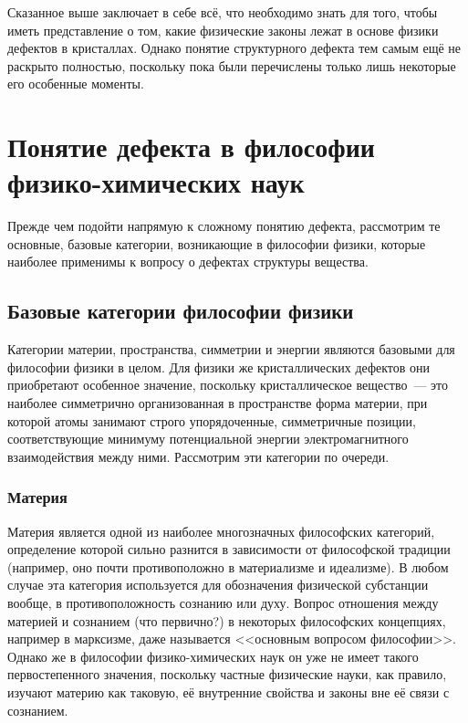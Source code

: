 \documentclass[a4paper, 14pt, titlepage]{extarticle}
\begin{document}

  Сказанное выше заключает в себе всё, что необходимо знать для того, чтобы иметь представление о
  том, какие физические законы лежат в основе физики дефектов в кристаллах. Однако понятие
  структурного дефекта тем самым ещё не раскрыто полностью, поскольку пока были перечислены только
  лишь некоторые его особенные моменты.

  \section{Понятие дефекта в философии физико-химических наук}

  Прежде чем подойти напрямую к сложному понятию дефекта, рассмотрим те основные, базовые категории,
  возникающие в философии физики, которые наиболее применимы к вопросу о дефектах структуры вещества.

  \subsection{Базовые категории философии физики}

  Категории материи, пространства, симметрии и энергии являются базовыми для философии физики в
  целом. Для физики же кристаллических дефектов они приобретают особенное значение, поскольку
  кристаллическое вещество~--- это наиболее симметрично организованная в пространстве форма материи,
  при которой атомы занимают строго упорядоченные, симметричные позиции, соответствующие минимуму потенциальной
  энергии электромагнитного взаимодействия между ними. Рассмотрим эти категории по очереди.

  \subsubsection{Материя}

  Материя является одной из наиболее многозначных философских категорий, определение которой сильно
  разнится в зависимости от философской традиции (например, оно почти противоположно в материализме
  и идеализме). В любом случае эта категория используется для обозначения физической субстанции
  вообще, в противоположность сознанию или духу. Вопрос отношения между материей и сознанием (что
  первично?) в некоторых философских концепциях, например в марксизме, даже называется <<основным
  вопросом философии>>. Однако же в философии физико-химических наук он уже не имеет такого
  первостепенного значения, поскольку частные физические науки, как правило, изучают материю как
  таковую, её внутренние свойства и законы вне её связи с сознанием.
\end{document}
